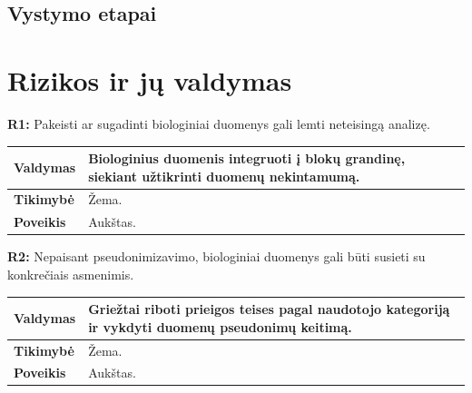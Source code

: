 \documentclass[12pt]{article}
\begin{document}

\subsection{Vystymo etapai}

\newpage

\section{Rizikos ir jų valdymas}
\noindent \textbf{R1:} Pakeisti ar sugadinti biologiniai duomenys gali lemti
neteisingą analizę.

\label{sec:R1}
\begin{table}[htb!]
    \captionsetup{justification=centering}
    \vskip -10pt
    \begin{tabular}{|m{3cm}|m{13.7cm}|}
        \hline
        \raggedleft \textbf{\cellcolor{deepchampagne}Valdymas} &
        Biologinius duomenis integruoti į blokų grandinę, siekiant užtikrinti
        duomenų nekintamumą. \\
        \hline
        \raggedleft \textbf{\cellcolor{deepchampagne}Tikimybė} & Žema. \\
        \hline
        \raggedleft \textbf{\cellcolor{deepchampagne}Poveikis} & Aukštas. \\
        \hline
    \end{tabular}
\end{table}

\noindent \textbf{R2:} Nepaisant pseudonimizavimo, biologiniai duomenys gali
būti susieti su konkrečiais asmenimis.

\label{sec:R2}
\begin{table}[htb!]
    \captionsetup{justification=centering}
    \vskip -10pt
    \begin{tabular}{|m{3cm}|m{13.7cm}|}
        \hline
        \raggedleft \textbf{\cellcolor{deepchampagne}Valdymas} &
        Griežtai riboti prieigos teises pagal naudotojo kategoriją ir vykdyti
        duomenų pseudonimų keitimą. \\
        \hline
        \raggedleft \textbf{\cellcolor{deepchampagne}Tikimybė} & Žema. \\
        \hline
        \raggedleft \textbf{\cellcolor{deepchampagne}Poveikis} & Aukštas. \\
        \hline
    \end{tabular}
\end{table}
\end{document}
